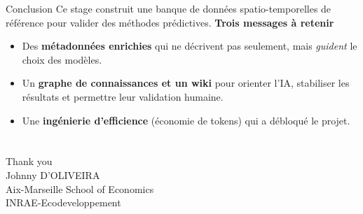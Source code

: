 \documentclass[aspectratio=169,11pt]{beamer}
\begin{document}
\begin{frame}{Conclusion}
\small
Ce stage construit une banque de données spatio-temporelles de référence pour valider des méthodes prédictives.
\vspace{0.3cm}
\textbf{Trois messages à retenir}
\begin{itemize}
    \item Des \textbf{métadonnées enrichies} qui ne décrivent pas seulement, mais \emph{guident} le choix des modèles.
    \vspace{0.15cm}
    \item Un \textbf{graphe de connaissances et un wiki} pour orienter l'IA,
    stabiliser les résultats et permettre leur validation humaine.
    \vspace{0.15cm}
    \item Une \textbf{ingénierie d'efficience} (économie de tokens) qui a débloqué le projet.
\end{itemize}
\end{frame}

\section*{}
\begin{frame}[plain]
  \begin{center}
    {\Huge Thank you}\\[1em]
    {\large Johnny D'OLIVEIRA}\\[0.3em]
    Aix-Marseille School of Economics\\[0.3em]
    INRAE-Ecodeveloppement
  \end{center}
\end{frame}
\end{document}
